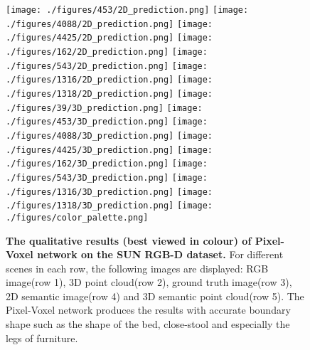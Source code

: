 \documentclass[letterpaper, 10 pt, conference]{ieeeconf}
\begin{document}
\begin{figure*}[thpb]
  \label{fig:2D_prediction453}{\texttt{[image: ./figures/453/2D\_prediction.png]}} 
  \label{fig:2D_prediction4088}{\texttt{[image: ./figures/4088/2D\_prediction.png]}} 
  \label{fig:2D_prediction4425}{\texttt{[image: ./figures/4425/2D\_prediction.png]}}
  \label{fig:2D_prediction162}{\texttt{[image: ./figures/162/2D\_prediction.png]}} 
  \label{fig:2D_prediction543}{\texttt{[image: ./figures/543/2D\_prediction.png]}} 
  \label{fig:2D_prediction1316}{\texttt{[image: ./figures/1316/2D\_prediction.png]}} 
  \label{fig:2D_prediction1318}{\texttt{[image: ./figures/1318/2D\_prediction.png]}} 
  \label{fig:3D_prediction39}{\texttt{[image: ./figures/39/3D\_prediction.png]}} 
  \label{fig:3D_prediction453}{\texttt{[image: ./figures/453/3D\_prediction.png]}} 
  \label{fig:3D_prediction4088}{\texttt{[image: ./figures/4088/3D\_prediction.png]}} 
  \label{fig:3D_prediction4425}{\texttt{[image: ./figures/4425/3D\_prediction.png]}} 
  \label{fig:3D_prediction162}{\texttt{[image: ./figures/162/3D\_prediction.png]}}
  \label{fig:3D_prediction543}{\texttt{[image: ./figures/543/3D\_prediction.png]}} 
  \label{fig:3D_prediction1316}{\texttt{[image: ./figures/1316/3D\_prediction.png]}} 
  \label{fig:3D_prediction1318}{\texttt{[image: ./figures/1318/3D\_prediction.png]}} 
  \label{fig:color_palette}{\texttt{[image: ./figures/color\_palette.png]}}


\caption{\textbf{The qualitative results (best viewed in colour) of Pixel-Voxel network on the SUN RGB-D dataset.} For different scenes in each row, the following images are displayed: RGB image(row 1), 3D point cloud(row 2), ground truth image(row 3), 2D semantic image(row 4) and 3D semantic point cloud(row 5). The Pixel-Voxel network produces the results with accurate boundary shape such as the shape of the bed, close-stool and especially the legs of furniture.}
\label{fig:qualitative_PVNet}
\end{figure*}
\end{document}
